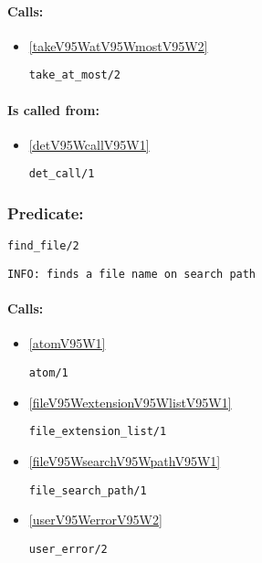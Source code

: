 \paragraph{Calls:} 
\begin{itemize}
\item \ref{takeV95WatV95WmostV95W2} 
\begin{verbatim}
take_at_most/2
\end{verbatim}

\end{itemize}
\paragraph{Is called from:} 
\begin{itemize}
\item \ref{detV95WcallV95W1} 
\begin{verbatim}
det_call/1
\end{verbatim}

\end{itemize}

\subsubsection{Predicate:} \label{findV95WfileV95W2}

\begin{verbatim}
find_file/2
\end{verbatim}

{\small \begin{verbatim}
INFO: finds a file name on search path

\end{verbatim}}
\paragraph{Calls:} 
\begin{itemize}
\item \ref{atomV95W1} 
\begin{verbatim}
atom/1
\end{verbatim}

\item \ref{fileV95WextensionV95WlistV95W1} 
\begin{verbatim}
file_extension_list/1
\end{verbatim}

\item \ref{fileV95WsearchV95WpathV95W1} 
\begin{verbatim}
file_search_path/1
\end{verbatim}

\item \ref{userV95WerrorV95W2} 
\begin{verbatim}
user_error/2
\end{verbatim}

\end{itemize}
